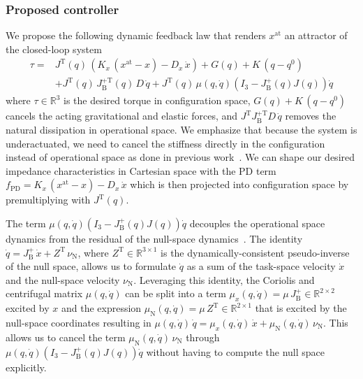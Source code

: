 \documentclass[letterpaper, 10pt, conference]{ieeeconf}      %
\begin{document}
\subsubsection{Proposed controller}
We propose the following dynamic feedback law that renders $x^\mathrm{at}$ an attractor of the closed-loop system %
\begin{equation}\label{eq:braincontrol:cartesian_impedance_controller}
\begin{split}
    \tau =& J^\mathrm{T}(q) \, \left (K_x \, (x^\mathrm{at} - x) - D_x \, \dot{x} \right ) + G(q) + K \, (q-q^0)\\
    &+ J^\mathrm{T}(q) \, J_\mathrm{B}^{+\mathrm{T}}(q) \, D \, \dot{q} + J^\mathrm{T}(q) \, \mu(q,\dot{q}) \left ( I_3 - J_\mathrm{B}^+(q) J(q) \right )\dot{q}
\end{split}
\end{equation}
where $\tau \in \mathbb{R}^3$ is the desired torque in configuration space, $G(q) + K \, (q-q^0)$ cancels the acting gravitational and elastic forces, and $J^\mathrm{T} J_\mathrm{B}^{+\mathrm{T}} D \, \dot{q}$ removes the natural dissipation in operational space.
We emphasize that because the system is underactuated, we need to cancel the stiffness directly in the configuration instead of operational space as done in previous work~\cite{della2020model}.
We can shape our desired impedance characteristics in Cartesian space with the PD term $f_\mathrm{PD} = K_x \, (x^\mathrm{at} - x) - D_x \, \dot{x} $ which is then projected into configuration space by premultiplying with $J^\mathrm{T}(q)$.

The term $\mu(q,\dot{q}) \left ( I_3 - J_\mathrm{B}^+(q) J(q) \right )\dot{q}$ decouples the operational space dynamics from the residual of the null-space dynamics~\cite{della2020model}\cite[Ch. 4]{ott2008cartesian}.
The identity $\dot{q} = J_\mathrm{B}^+ \, \dot{x} + Z^\mathrm{T} \, \nu_\mathrm{N}$, where $Z^\mathrm{T} \in \mathbb{R}^{3 \times 1}$ is the dynamically-consistent pseudo-inverse of the null space, allows us to formulate $\dot{q}$ as a sum of the task-space velocity $\dot{x}$ and the null-space velocity $\nu_\mathrm{N}$. Leveraging this identity, the Coriolis and centrifugal matrix $\mu(q,\dot{q})$ can be split into a term $\mu_x(q,\dot{q}) = \mu \, J_\mathrm{B}^+ \in \mathbb{R}^{2 \times 2}$ excited by $x$ and the expression $\mu_\mathrm{N}(q,\dot{q}) = \mu \, Z^\mathrm{T} \in \mathbb{R}^{2 \times 1}$ that is excited by the null-space coordinates resulting in $\mu(q,\dot{q}) \, \dot{q} = \mu_x(q,\dot{q}) \, \dot{x} + \mu_\mathrm{N}(q,\dot{q}) \, \nu_\mathrm{N}$.
This allows us to cancel the term $\mu_\mathrm{N}(q,\dot{q}) \, \nu_\mathrm{N}$ through $\mu(q,\dot{q}) \left ( I_3 - J_\mathrm{B}^+(q) J(q) \right )\dot{q}$ without having to compute the null space explicitly.
\end{document}
